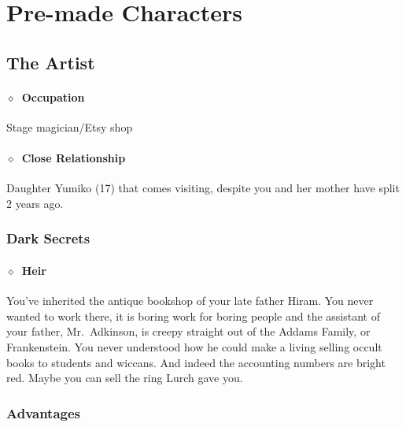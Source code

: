 \section{Pre-made Characters}%
\label{sec:pre_made_characters}

\subsection{The Artist}%
\label{sub:the_artist}


\paragraph{\(\diamond\)~Occupation}%
Stage magician/Etsy shop
\paragraph{\(\diamond\)~Close Relationship}%
Daughter Yumiko (17) that comes visiting, despite you and her mother have split 2 years ago.

%
%
%

\subsubsection{Dark Secrets}%
\label{ssub:artist_dark_secrets}

\paragraph{\(\diamond\)~Heir}%
You've inherited the antique bookshop of your late father Hiram. You never wanted to work there, it is boring work for boring
people and the assistant of your father, Mr.~Adkinson, is creepy straight out of the Addams Family, or Frankenstein. You never
understood how he could make a living selling occult books to students and wiccans. And indeed the accounting numbers are
bright red. Maybe you can sell the ring Lurch gave you.
\KULTrule%

\subsubsection{Advantages}%
\label{ssub:artist_advantages}

